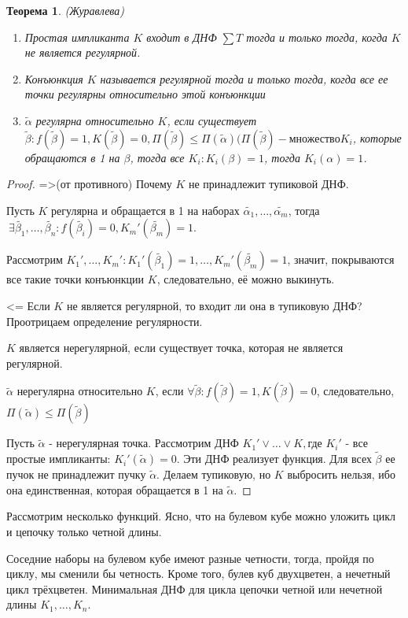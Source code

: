 \documentclass[final]{report}
\newtheorem* {theor} {Теорема}
\theoremstyle {remark}
\theoremstyle {remark}
\begin{document}
\begin{theor}(Журавлева)
\begin{enumerate}
\item Простая импликанта $K$ входит в ДНФ $\sum T$ тогда и только тогда, когда $K$ не является регулярной.
\item Конъюнкция $K$ называется регулярной тогда и только тогда, когда все ее точки регулярны относительно этой конъюнкции
\item $\tilde{\alpha}$ регулярна относительно $K$, если существует $\tilde{\beta}: f(\tilde{\beta})=1, K(\tilde{\beta})=0, \Pi(\tilde{\beta})\leq\Pi(\tilde{\alpha}) (\Pi(\tilde{\beta}) - \text{множество} K_i$, которые обращаются в 1 на $\beta$, тогда все $K_i: K_i(\beta)=1$, тогда $K_i(\alpha)=1$.
\end{enumerate}
\end{theor}
\begin{proof}
=>(от противного) Почему $K$ не принадлежит тупиковой ДНФ.

Пусть $K$ регулярна и обращается в 1 на наборах $\tilde{\alpha_1},\ldots,\tilde{\alpha_m}$, тогда $\ \exists \tilde{\beta_1},\ldots,\tilde{\beta_n}: f(\tilde{\beta_i})=0, K_m '(\tilde{\beta_m})=1$.

Рассмотрим $K_1',\ldots,K_m': K_1'(\tilde{\beta_1})=1,\ldots, K_m'(\tilde{\beta_m})=1$, значит, покрываются все такие точки конъюнкции $K$, следовательно, её можно выкинуть.

<= Если $K$ не является регулярной, то входит ли она в тупиковую ДНФ? Проотрицаем определение регулярности.

$K$ является нерегулярной, если существует точка, которая не является регулярной.

$\tilde{\alpha}$ нерегулярна относительно $K$, если $\forall \tilde{\beta}: f(\tilde{\beta})=1, K(\tilde{\beta})=0$, следовательно, $\Pi(\tilde{\alpha})\leq\Pi(\tilde{\beta})$

Пусть $\tilde{\alpha}$ - нерегулярная точка.
Рассмотрим ДНФ $K_1'\lor\ldots\lor K, \text{где } K_i'$ - все простые импликанты: $K_i'(\tilde{\alpha})=0$.
Эти ДНФ реализует функция.
Для всех $\tilde{\beta}$ ее пучок не принадлежит пучку $\tilde{\alpha}$. Делаем тупиковую, но $K$ выбросить нельзя, ибо она единственная, которая обращается в 1 на $\tilde{\alpha}$.
\end{proof}
Рассмотрим несколько функций. Ясно, что на булевом кубе можно уложить цикл и цепочку только четной длины.

Соседние наборы на булевом кубе имеют разные четности, тогда, пройдя по циклу, мы сменили бы четность. Кроме того, булев куб двухцветен, а нечетный цикл трёхцветен. Минимальная ДНФ для цикла цепочки четной или нечетной длины $K_1,\ldots, K_n$.
\end{document}
